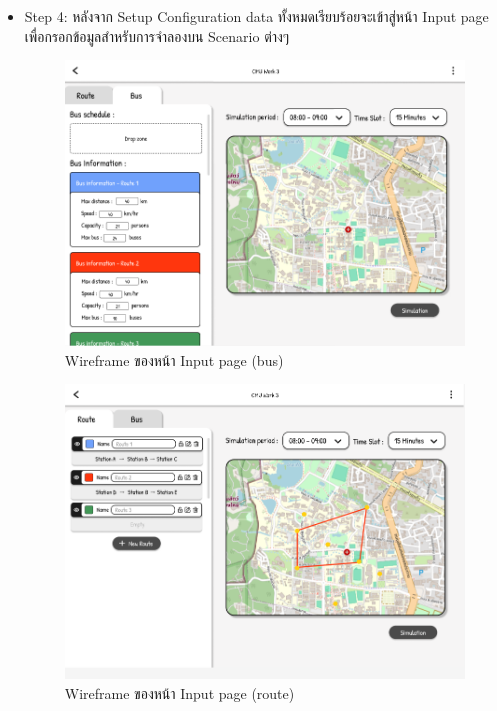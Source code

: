 \begin{mypara}
\begin{itemize}
    \item Step 4: หลังจาก Setup Configuration data ทั้งหมดเรียบร้อยจะเข้าสู่หน้า Input page เพื่อกรอกข้อมูลสำหรับการจำลองบน Scenario ต่างๆ
      \begin{figure}[H]
        \centering
        \includegraphics[scale=0.4]{input_bus.png}
        \caption{Wireframe ของหน้า Input page (bus) }
        \label{fig:WireframeInputGuest}
      \end{figure}
      \begin{figure}[H]
        \centering
        \includegraphics[scale=0.4]{input_route.png}
        \caption{Wireframe ของหน้า Input page (route) }
        \label{fig:WireframeInputRouteGuest}
      \end{figure}


\end{itemize}
\end{mypara}
